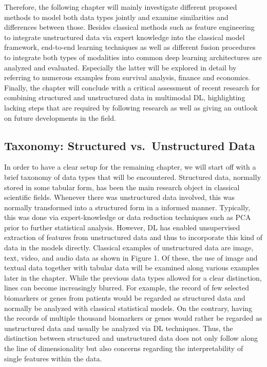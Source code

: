 \documentclass[
]{krantz}
\begin{document}
Therefore, the following chapter will mainly investigate different proposed methods to model both data types jointly and examine similarities and differences between those. Besides classical methods such as feature engineering to integrate unstructured data via expert knowledge into the classical model framework, end-to-end learning techniques as well as different fusion procedures to integrate both types of modalities into common deep learning architectures are analyzed and evaluated. Especially the latter will be explored in detail by referring to numerous examples from survival analysis, finance and economics.
Finally, the chapter will conclude with a critical assessment of recent research for combining structured and unstructured data in multimodal DL, highlighting lacking steps that are required by following research as well as giving an outlook on future developments in the field.

\hypertarget{taxonomy-structured-vs.-unstructured-data}{%
\subsection{Taxonomy: Structured vs.~Unstructured Data}\label{taxonomy-structured-vs.-unstructured-data}}

In order to have a clear setup for the remaining chapter, we will start off with a brief taxonomy of data types that will be encountered. Structured data, normally stored in some tabular form, has been the main research object in classical scientific fields. Whenever there was unstructured data involved, this was normally transformed into a structured form in a informed manner. Typically, this was done via expert-knowledge or data reduction techniques such as PCA prior to further statistical analysis. However, DL has enabled unsupervised extraction of features from unstructured data and thus to incorporate this kind of data in the models directly. Classical examples of unstructured data are image, text, video, and audio data as shown in Figure 1. Of these, the use of image and textual data together with tabular data will be examined along various examples later in the chapter. While the previous data types allowed for a clear distinction, lines can become increasingly blurred. For example, the record of few selected biomarkers or genes from patients would be regarded as structured data and normally be analyzed with classical statistical models. On the contrary, having the records of multiple thousand biomarkers or genes would rather be regarded as unstructured data and usually be analyzed via DL techniques. Thus, the distinction between structured and unstructured data does not only follow along the line of dimensionality but also concerns regarding the interpretability of single features within the data.
\end{document}
